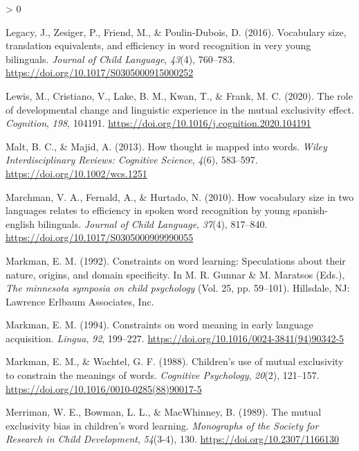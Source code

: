 \documentclass[
  english,
  ,man,floatsintext]{apa6}
\newlength{\cslhangindent}
\newenvironment{CSLReferences}[2] %
 {%
  \setlength{\parindent}{0pt}
  \ifodd #1 \everypar{\setlength{\hangindent}{\cslhangindent}}\ignorespaces\fi
  \ifnum #2 > 0
  \setlength{\parskip}{#2\baselineskip}
  \fi
 }%
 {}
\begin{document}
\begin{CSLReferences}{1}{0}
\leavevmode\hypertarget{ref-Legacy_etal_2016}{}%
Legacy, J., Zesiger, P., Friend, M., \& Poulin-Dubois, D. (2016). Vocabulary size, translation equivalents, and efficiency in word recognition in very young bilinguals. \emph{Journal of Child Language}, \emph{43}(4), 760--783. \url{https://doi.org/10.1017/S0305000915000252}

\leavevmode\hypertarget{ref-Lewis_etal_2020}{}%
Lewis, M., Cristiano, V., Lake, B. M., Kwan, T., \& Frank, M. C. (2020). The role of developmental change and linguistic experience in the mutual exclusivity effect. \emph{Cognition}, \emph{198}, 104191. \url{https://doi.org/10.1016/j.cognition.2020.104191}

\leavevmode\hypertarget{ref-Malt_Majid_2013}{}%
Malt, B. C., \& Majid, A. (2013). How thought is mapped into words. \emph{Wiley Interdisciplinary Reviews: Cognitive Science}, \emph{4}(6), 583--597. \url{https://doi.org/10.1002/wcs.1251}

\leavevmode\hypertarget{ref-Marchman_etal_2010}{}%
Marchman, V. A., Fernald, A., \& Hurtado, N. (2010). How vocabulary size in two languages relates to efficiency in spoken word recognition by young spanish-english bilinguals. \emph{Journal of Child Language}, \emph{37}(4), 817--840. \url{https://doi.org/10.1017/S0305000909990055}

\leavevmode\hypertarget{ref-Markman_1992}{}%
Markman, E. M. (1992). Constraints on word learning: Speculations about their nature, origins, and domain specificity. In M. R. Gunnar \& M. Maratsos (Eds.), \emph{The minnesota symposia on child psychology} (Vol. 25, pp. 59--101). Hillsdale, NJ: Lawrence Erlbaum Associates, Inc.

\leavevmode\hypertarget{ref-Markman_1994}{}%
Markman, E. M. (1994). Constraints on word meaning in early language acquisition. \emph{Lingua}, \emph{92}, 199--227. \url{https://doi.org/10.1016/0024-3841(94)90342-5}

\leavevmode\hypertarget{ref-Markman_Wachtel_1988}{}%
Markman, E. M., \& Wachtel, G. F. (1988). Children's use of mutual exclusivity to constrain the meanings of words. \emph{Cognitive Psychology}, \emph{20}(2), 121--157. \url{https://doi.org/10.1016/0010-0285(88)90017-5}

\leavevmode\hypertarget{ref-Merriman_etal_1989}{}%
Merriman, W. E., Bowman, L. L., \& MacWhinney, B. (1989). The mutual exclusivity bias in children's word learning. \emph{Monographs of the Society for Research in Child Development}, \emph{54}(3-4), 130. \url{https://doi.org/10.2307/1166130}


\end{CSLReferences}
\end{document}
